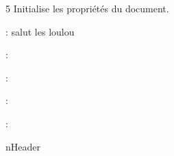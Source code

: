 {5}
{Initialise les propriétés du document.}
{
	\item {} : salut les loulou
	\item {} :
	\item {} :
	\item {} :
	\item {} :
}
{nHeader}

